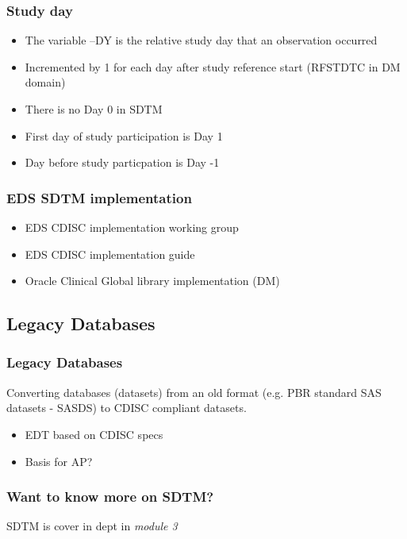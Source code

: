 \documentclass{beamer}
\begin{document}
\begin{frame}
  \frametitle{Study day}

  \begin{itemize}
		\item The variable --DY is the relative study day that an observation occurred
		\item Incremented by 1 for each day after study reference start (RFSTDTC in DM domain)
		\item There is no Day 0 in SDTM
		\item First day of study participation is Day 1
		\item Day before study particpation is Day -1
  \end{itemize}
\end{frame}

\begin{frame}
  \frametitle{EDS SDTM implementation}
  
  \begin{itemize}
		\item EDS CDISC implementation working group
		\item EDS CDISC implementation guide
		\item Oracle Clinical Global library implementation (DM)
  \end{itemize}
\end{frame}


\subsection[Legacy DB]{Legacy Databases}
\begin{frame}
	\frametitle{Legacy Databases}

	Converting databases (datasets) from an old format (e.g. PBR standard SAS datasets - SASDS)
	to CDISC compliant datasets.
	
	\begin{itemize}
		\item EDT based on CDISC specs
		\item Basis for AP?
	\end{itemize}
\end{frame}

\begin{frame}
	\frametitle{Want to know more on SDTM?}
	
	SDTM is cover in dept in \emph{module 3}
\end{frame}
\end{document}
